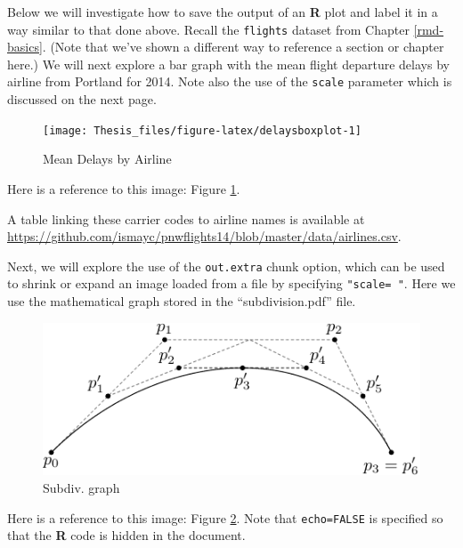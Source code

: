 \documentclass[12pt,twoside]{Mactemplate}
\theoremstyle{definition}
\theoremstyle{definition}
\theoremstyle{definition}
\theoremstyle{remark}
\begin{document}
Below we will investigate how to save the output of an \textbf{R} plot
and label it in a way similar to that done above. Recall the
\texttt{flights} dataset from Chapter \ref{rmd-basics}. (Note that we've
shown a different way to reference a section or chapter here.) We will
next explore a bar graph with the mean flight departure delays by
airline from Portland for 2014. Note also the use of the \texttt{scale}
parameter which is discussed on the next page.
\begin{Shaded}
\end{Shaded}
\begin{figure}

{\centering \texttt{[image: Thesis\_files/figure-latex/delaysboxplot-1]} 

}

\caption{Mean Delays by Airline}\label{fig:delaysboxplot}
\end{figure}
Here is a reference to this image: Figure \ref{fig:delaysboxplot}.

A table linking these carrier codes to airline names is available at
\url{https://github.com/ismayc/pnwflights14/blob/master/data/airlines.csv}.

\clearpage

Next, we will explore the use of the \texttt{out.extra} chunk option,
which can be used to shrink or expand an image loaded from a file by
specifying \texttt{"scale=\ "}. Here we use the mathematical graph
stored in the ``subdivision.pdf'' file.
\begin{figure}

{\centering \includegraphics[scale=0.75]{figure/subdivision} 

}

\caption{Subdiv. graph}\label{fig:subd}
\end{figure}
Here is a reference to this image: Figure \ref{fig:subd}. Note that
\texttt{echo=FALSE} is specified so that the \textbf{R} code is hidden
in the document.
\end{document}
